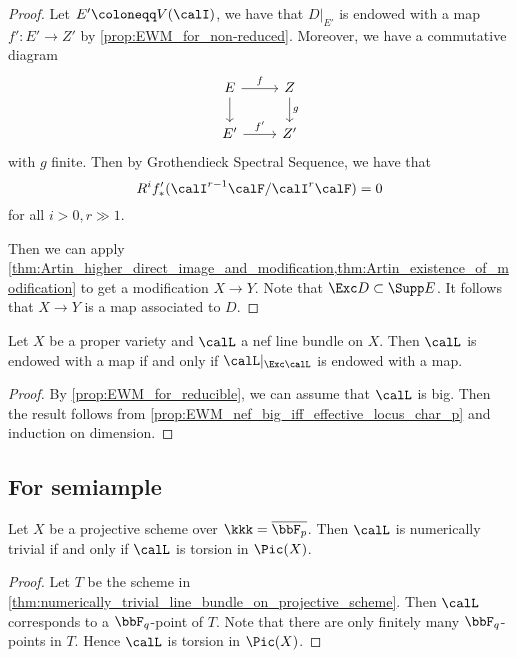 \begin{proof}
        Let \(E' \coloneqq V(\calI)\), we have that \(D|_{E'}\) is endowed with a map \(f':E' \to Z'\) by \cref{prop:EWM_for_non-reduced}.
        Moreover, we have a commutative diagram
        \[ \begin{tikzcd}
            E \arrow[r, "f"] \arrow[d] & Z \arrow[d, "g"] \\
            E' \arrow[r, "f'"] & Z'
        \end{tikzcd} \]
        with \(g\) finite.
        Then by Grothendieck Spectral Sequence, we have that
        \[ R^if'_*(\calI^{r-1}\calF/\calI^{r}\calF) = 0 \]
        for all \(i > 0, r \gg 1\).
        
        Then we can apply \cref{thm:Artin_higher_direct_image_and_modification,thm:Artin_existence_of_modification} to get a modification \(X \to Y\).
        Note that \(\Exc D \subset \Supp E\).
        It follows that \(X \to Y\) is a map associated to \(D\).
    \end{proof}

    \begin{theorem}\label{thm:EWM_iff_EWM_on_exceptional_locus}
        Let \(X\) be a proper variety and \(\calL\) a nef line bundle on \(X\).
        Then \(\calL\) is endowed with a map if and only if \(\calL|_{\Exc \calL}\) is endowed with a map.
    \end{theorem}
    \begin{proof}
        By \cref{prop:EWM_for_reducible}, we can assume that \(\calL\) is big.
        Then the result follows from \cref{prop:EWM_nef_big_iff_effective_locus_char_p} and induction on dimension.
    \end{proof}


\subsection{For semiample}

    \begin{lemma}\label{lem:pic0_over_overline_bbf_p_is_torsion}
        Let \(X\) be a projective scheme over \(\kkk = \overline{\bbF_p}\).
        Then \(\calL\) is numerically trivial if and only if \(\calL\) is torsion in \(\Pic(X)\).
    \end{lemma}
    \begin{proof}
        Let \(T\) be the scheme in \cref{thm:numerically_trivial_line_bundle_on_projective_scheme}.
        Then \(\calL\) corresponds to a \(\bbF_q\)-point of \(T\).
        Note that there are only finitely many \(\bbF_q\)-points in \(T\).
        Hence \(\calL\) is torsion in \(\Pic(X)\). 
    \end{proof}

